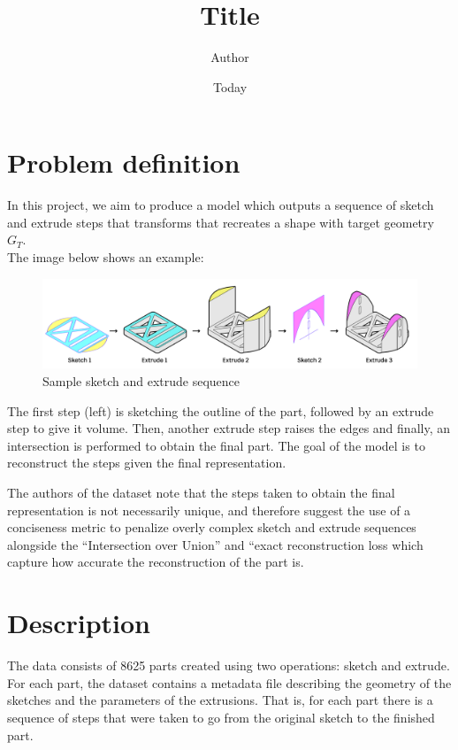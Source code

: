 \documentclass[]{article}
\begin{document}
\title{Title}
\author{Author}
\date{Today}
\maketitle

\section{Problem definition } 

In this project, we aim to produce a model which outputs a sequence of sketch and extrude steps that transforms that recreates a shape with target geometry $G_{T}$. \\

The image below shows an example: 

\begin{figure}
	\includegraphics[width=\textwidth]{sketch-extrude} 
	\caption{Sample sketch and extrude sequence}
\end{figure}

The first step (left) is sketching the outline of the part, followed by an extrude step to give it volume. Then, another extrude step raises the edges and finally, an intersection is performed to obtain the final part. The goal of the model is to reconstruct the steps given the final representation. 

The authors of the dataset note that the steps taken to obtain the final representation is not necessarily unique, and therefore suggest the use of a conciseness metric to penalize overly complex sketch and extrude sequences alongside the “Intersection over Union” and “exact reconstruction loss which capture how accurate the reconstruction of the part is.

\section{Description}

The data consists of 8625 parts created using two operations: sketch and extrude. For each part, the dataset contains a metadata file describing the geometry of the sketches and the parameters of the extrusions. That is, for each part there is a sequence of steps that were taken to go from the original sketch to the finished part.
\end{document}
